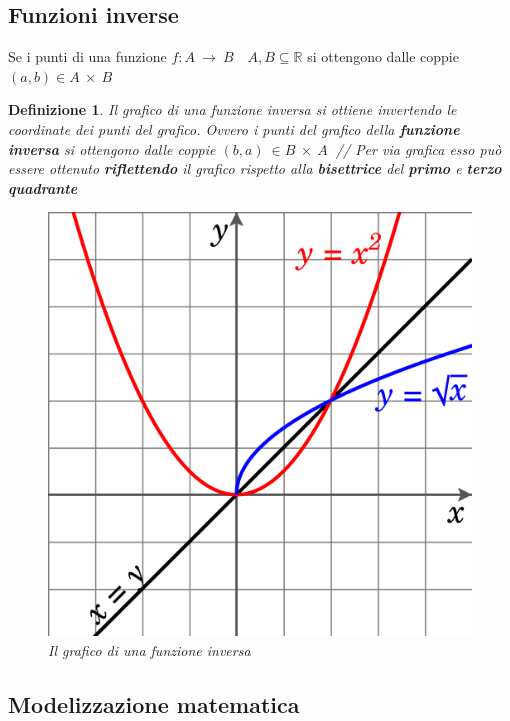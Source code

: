 \documentclass[12pt, a4paper]{article}
\theoremstyle{break}
\newtheorem{defn}{Definizione}
\theoremstyle{lemma}
\theoremstyle{lemma}
\theoremstyle{lemma}
\begin{document}
\subsection{Funzioni inverse}
Se i punti di una funzione $ f : A\ \rightarrow \ B \quad A,B \subseteq \mathbb{R} $ si ottengono dalle coppie $ (a,b)\in A\ \times\ B $
\begin{defn}
Il grafico di una funzione inversa si ottiene invertendo le coordinate dei punti del grafico. Ovvero i punti del grafico della \textbf{funzione inversa} si ottengono dalle coppie $(b,a)\ \in B\ \times\ A\ $ //
Per via grafica esso può essere ottenuto \textbf{riflettendo} il grafico rispetto alla \textbf{bisettrice} del \textbf{primo} e \textbf{terzo quadrante}

\begin{figure}[ht]
  \centering
  \includegraphics[scale=0.1]{funzioneinversa}
  \caption{Il grafico di una funzione inversa}
  \label{fig:grafico_funzione_inversa}
\end{figure}
\end{defn}



\subsection{Modelizzazione matematica}
\end{document}
